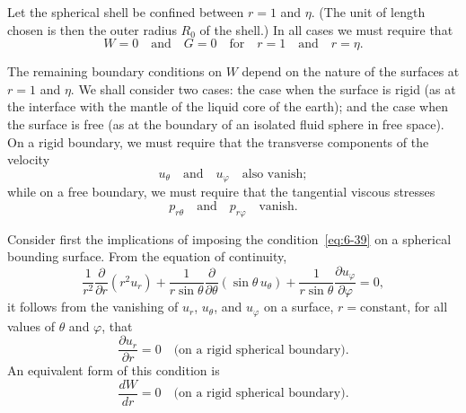 Let the spherical shell be confined between $r = 1$ and $\eta$. (The unit of
length chosen is then the outer radius $R_0$ of the shell.)
In all cases we must require that
\begin{equation}\label{eq:6-38}
W = 0\quad\text{and}\quad G = 0\quad\text{for}\quad r = 1 \quad\text{and}\quad r = \eta.
\end{equation}

The remaining boundary conditions on $W$ depend on the nature of the
surfaces at $r = 1$ and $\eta$. We shall consider two cases: the case when the
surface is rigid (as at the interface with the mantle of the liquid core of
the earth); and the case when the surface is free (as at the boundary of
an isolated fluid sphere in free space). On a rigid boundary, we must
require that the transverse components of the velocity
\begin{equation}\label{eq:6-39}
u_\theta \quad\text{and}\quad u_\varphi \quad\text{also vanish};
\end{equation}
while on a free boundary, we must require that the tangential viscous
stresses
\begin{equation}\label{eq:6-40}
p_{r\theta} \quad\text{and}\quad p_{r\varphi} \quad\text{vanish}.
\end{equation}

Consider first the implications of imposing the condition~\eqref{eq:6-39} on a
spherical bounding surface. From the equation of continuity,
\begin{equation}\label{eq:6-41}
\frac{1}{r^2}\frac{\partial}{\partial r}(r^2 u_r) + \frac{1}{r\sin\theta}\frac{\partial}{\partial\theta}(\sin\theta\, u_\theta) + \frac{1}{r\sin\theta}\frac{\partial u_\varphi}{\partial\varphi} = 0,
\end{equation}
it follows from the vanishing of $u_r$, $u_\theta$, and $u_\varphi$ on a surface, $r = \text{constant}$,
for all values of $\theta$ and $\varphi$, that
\begin{equation}\label{eq:6-42}
\frac{\partial u_r}{\partial r} = 0 \quad\text{(on a rigid spherical boundary)}.
\end{equation}
An equivalent form of this condition is
\begin{equation}\label{eq:6-43}
\frac{dW}{dr} = 0 \quad\text{(on a rigid spherical boundary)}.
\end{equation}

